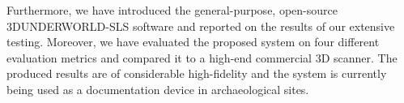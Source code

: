 \documentclass[final,12pt,3p]{elsarticle}
\begin{document}
Furthermore, we have introduced the general-purpose, open-source 3DUNDERWORLD-SLS software and reported on the results of our extensive testing. Moreover, we have evaluated the proposed system on four different evaluation metrics and compared it to a high-end commercial 3D scanner. The produced results are of considerable high-fidelity and the system is currently being used as a documentation device in archaeological sites.

\begin{landscape}
\begin{figure}[!ht]
	\centering

\end{figure}
\end{landscape}
\end{document}
